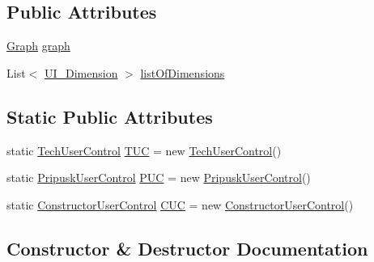 \subsection*{Public Attributes}
\begin{DoxyCompactItemize}
\item 
\mbox{\hyperlink{class_dimension___chain_1_1_graph}{Graph}} \mbox{\hyperlink{class_dimension___chain_1_1_controller_ae84586e81da96ca1cc20a4044140769b}{graph}}
\item 
List$<$ \mbox{\hyperlink{class_dimension___chain_1_1_u_i___dimension}{U\+I\+\_\+\+Dimension}} $>$ \mbox{\hyperlink{class_dimension___chain_1_1_controller_acbb1b92f0d75262909a5d909afc99800}{list\+Of\+Dimensions}}
\end{DoxyCompactItemize}
\subsection*{Static Public Attributes}
\begin{DoxyCompactItemize}
\item 
static \mbox{\hyperlink{class_dimension___chain_1_1_tech_user_control}{Tech\+User\+Control}} \mbox{\hyperlink{class_dimension___chain_1_1_controller_a1547436a62102acbfce6b42eaabe4218}{T\+UC}} = new \mbox{\hyperlink{class_dimension___chain_1_1_tech_user_control}{Tech\+User\+Control}}()
\item 
static \mbox{\hyperlink{class_dimension___chain_1_1_pripusk_user_control}{Pripusk\+User\+Control}} \mbox{\hyperlink{class_dimension___chain_1_1_controller_a04aadf04988418c18ea1f1bb1f0fd59a}{P\+UC}} = new \mbox{\hyperlink{class_dimension___chain_1_1_pripusk_user_control}{Pripusk\+User\+Control}}()
\item 
static \mbox{\hyperlink{class_dimension___chain_1_1_constructor_user_control}{Constructor\+User\+Control}} \mbox{\hyperlink{class_dimension___chain_1_1_controller_a8541e9fa22540265ba3ca9bc0f8835da}{C\+UC}} = new \mbox{\hyperlink{class_dimension___chain_1_1_constructor_user_control}{Constructor\+User\+Control}}()
\end{DoxyCompactItemize}


\subsection{Constructor \& Destructor Documentation}
\mbox{\label{class_dimension___chain_1_1_controller_a74201e6ac926c9d9028d0f465f037704}} 
